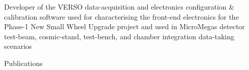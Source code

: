 \begin{minipage}{0.8\textwidth}
\vspace{0.15in}
\hspace{0.2in}
\begin{minipage}{\textwidth}
Developer of the \textsc{VERSO} data-acquisition and electronics configuration \& calibration
software used for characterising the front-end electronics for the Phase-1 New Small Wheel Upgrade project and used
in MicroMegas detector test-beam, cosmic-stand, test-bench, and chamber integration data-taking
scenarios
\end{minipage}



\end{minipage}

\newpage
\vspace{0.25in}
{\Large Publications}\\
\HRule

